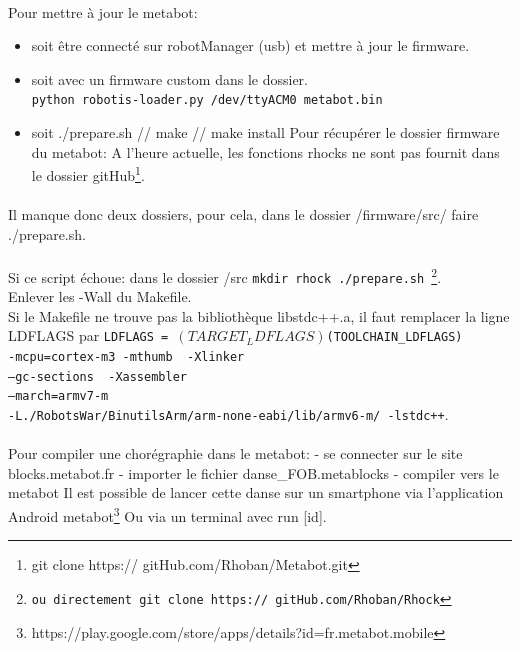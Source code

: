 \documentclass[10pt,a4paper]{report}
\begin{document}
\begin{appendices}
\paragraph{}
Pour mettre à jour le metabot:
\begin{itemize}
\item soit être connecté sur robotManager (usb) et mettre à jour le firmware.
\item soit avec un firmware custom dans le dossier.\\
    \texttt{python robotis-loader.py /dev/ttyACM0 metabot.bin}
\item soit ./prepare.sh // make // make install
Pour récupérer le dossier firmware du metabot:
A l'heure actuelle, les fonctions rhocks ne sont pas fournit dans le dossier  gitHub\footnote{git clone https:// gitHub.com/Rhoban/Metabot.git}.
\end{itemize}

\paragraph{}
Il manque donc deux dossiers, pour cela, dans le dossier /firmware/src/ faire ./prepare.sh.
\paragraph{}
Si ce script échoue: dans le dossier /src \texttt{mkdir rhock ./prepare.sh \footnote{ou directement git clone https:// gitHub.com/Rhoban/Rhock}}. \\
Enlever les -Wall du Makefile.\\
Si le Makefile ne trouve pas la bibliothèque libstdc++.a, il faut remplacer la ligne LDFLAGS par  
\texttt{LDFLAGS = $(TARGET_LDFLAGS) $(TOOLCHAIN\_LDFLAGS)\\ 
-mcpu=cortex-m3 -mthumb \ -Xlinker\\ 
--gc-sections \ -Xassembler\\
--march=armv7-m \ \\
-L./RobotsWar/BinutilsArm/arm-none-eabi/lib/armv6-m/ -lstdc++}.
\paragraph{}
Pour compiler une chorégraphie dans le metabot:
- se connecter sur le site blocks.metabot.fr
- importer le fichier danse\_FOB.metablocks
- compiler vers le metabot
Il est possible de lancer cette danse sur un smartphone via l'application Android metabot\footnote{https://play.google.com/store/apps/details?id=fr.metabot.mobile} Ou via un terminal avec run [id].

\end{appendices}
\end{document}

